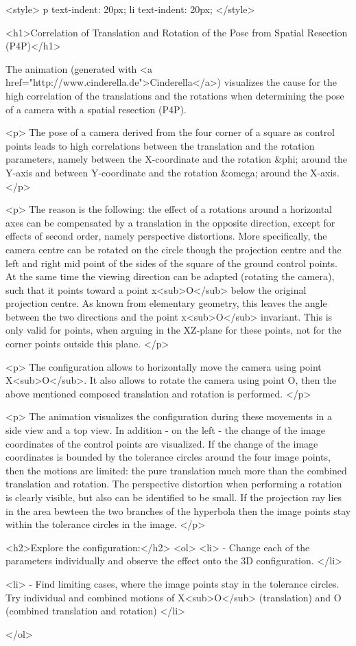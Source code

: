 <style>
p {
  text-indent: 20px;
}
li {
  text-indent: 20px;
}
</style>

<h1>Correlation of Translation and Rotation of the Pose from Spatial Resection (P4P)</h1> 


The  animation (generated with  <a href="http://www.cinderella.de">Cinderella</a>) visualizes the cause for the high correlation of the translations and the rotations when determining the pose of a camera with a spatial resection (P4P).
    
<p> The pose of a camera derived from the four corner of a square as control points leads to high correlations between the translation and the rotation parameters, namely between the X-coordinate and the rotation &phi; around the Y-axis and between Y-coordinate and the rotation &omega; around the X-axis. </p>


<p> The reason is the following:   
the effect of a rotations around a horizontal axes can be compensated by a translation in the opposite direction, except for effects of second order, namely perspective distortions. More specifically, the camera centre can be rotated on the circle though the projection centre and the left and right mid point of the sides of the square of the ground control points. At the same time the viewing direction can be adapted (rotating the camera), such that it points toward a point x<sub>O</sub> below the original projection centre. As known from elementary geometry, this leaves the angle between the two directions and the point x<sub>O</sub> invariant.  
This is only valid for points, when arguing in the XZ-plane for these points, not for the corner points outside this plane.
</p>


<p> The configuration allows to horizontally move the camera using point X<sub>O</sub>. It also allows to rotate the camera using point O, then the above mentioned composed translation and rotation is performed. </p>

<p> The animation visualizes the configuration during these movements in a side view and a top view. In addition - on the left - the change of the image coordinates of the control points are visualized. If the change of the image coordinates is bounded by the tolerance circles around the four image points, then the motions are limited: the pure translation much more than the combined translation and rotation. The perspective distortion when performing a rotation is clearly visible, but also can be identified to be small. If the projection ray lies in the area bewteen the two branches of the hyperbola then the image points stay within the tolerance circles in the image. </p>



    

    <h2>Explore the configuration:</h2>
    <ol>
      <li>  - Change each of the parameters individually and observe the effect onto the 3D configuration. </li>
 			
 			<li>  - Find limiting cases, where the image points stay in the tolerance circles. Try individual and combined motions of X<sub>O</sub> (translation) and O (combined translation and rotation) </li>
 			
 			
 			
	    
	        </ol>